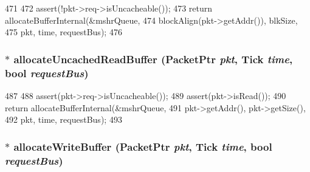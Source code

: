 \begin{DoxyCode}
471     {
472         assert(!pkt->req->isUncacheable());
473         return allocateBufferInternal(&mshrQueue,
474                                       blockAlign(pkt->getAddr()), blkSize,
475                                       pkt, time, requestBus);
476     }
\end{DoxyCode}
\hypertarget{classBaseCache_a8dfb4bae0c201cd12ca22dd159740541}{
\subsubsection[{allocateUncachedReadBuffer}]{$\ast$ allocateUncachedReadBuffer ({\bf PacketPtr} {\em pkt}, \/  {\bf Tick} {\em time}, \/  bool {\em requestBus})}}
\label{classBaseCache_a8dfb4bae0c201cd12ca22dd159740541}



\begin{DoxyCode}
487     {
488         assert(pkt->req->isUncacheable());
489         assert(pkt->isRead());
490         return allocateBufferInternal(&mshrQueue,
491                                       pkt->getAddr(), pkt->getSize(),
492                                       pkt, time, requestBus);
493     }
\end{DoxyCode}
\hypertarget{classBaseCache_a3f81ca9ba6f7294f930eca229838edc6}{
\subsubsection[{allocateWriteBuffer}]{$\ast$ allocateWriteBuffer ({\bf PacketPtr} {\em pkt}, \/  {\bf Tick} {\em time}, \/  bool {\em requestBus})}}
\label{classBaseCache_a3f81ca9ba6f7294f930eca229838edc6}



